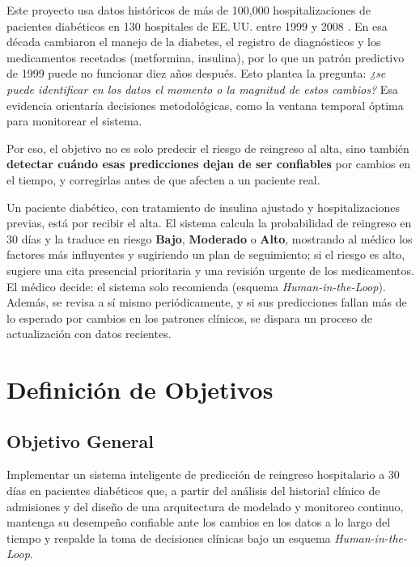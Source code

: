 \documentclass[11pt,a4paper]{article}
\begin{document}
Este proyecto usa datos históricos de más de 100,000 hospitalizaciones de pacientes diabéticos en 130 hospitales de EE.\,UU. entre 1999 y 2008 \cite{strack2014}. En esa década cambiaron el manejo de la diabetes, el registro de diagnósticos y los medicamentos recetados (metformina, insulina), por lo que un patrón predictivo de 1999 puede no funcionar diez años después. Esto plantea la pregunta: \emph{¿se puede identificar en los datos el momento o la magnitud de estos cambios?} Esa evidencia orientaría decisiones metodológicas, como la ventana temporal óptima para monitorear el sistema.

Por eso, el objetivo no es solo predecir el riesgo de reingreso al alta, sino también \textbf{detectar cuándo esas predicciones dejan de ser confiables} por cambios en el tiempo, y corregirlas antes de que afecten a un paciente real.

Un paciente diabético, con tratamiento de insulina ajustado y hospitalizaciones previas, está por recibir el alta. El sistema calcula la probabilidad de reingreso en 30 días y la traduce en riesgo \textbf{Bajo}, \textbf{Moderado} o \textbf{Alto}, mostrando al médico los factores más influyentes y sugiriendo un plan de seguimiento; si el riesgo es alto, sugiere una cita presencial prioritaria y una revisión urgente de los medicamentos. El médico decide: el sistema solo recomienda (esquema \emph{Human-in-the-Loop}). Además, se revisa a sí mismo periódicamente, y si sus predicciones fallan más de lo esperado por cambios en los patrones clínicos, se dispara un proceso de actualización con datos recientes.

\section{Definición de Objetivos}

\subsection{Objetivo General}
Implementar un sistema inteligente de predicción de reingreso hospitalario a 30 días en pacientes diabéticos que, a partir del análisis del historial clínico de admisiones y del diseño de una arquitectura de modelado y monitoreo continuo, mantenga su desempeño confiable ante los cambios en los datos a lo largo del tiempo y respalde la toma de decisiones clínicas bajo un esquema \emph{Human-in-the-Loop}.
\end{document}
